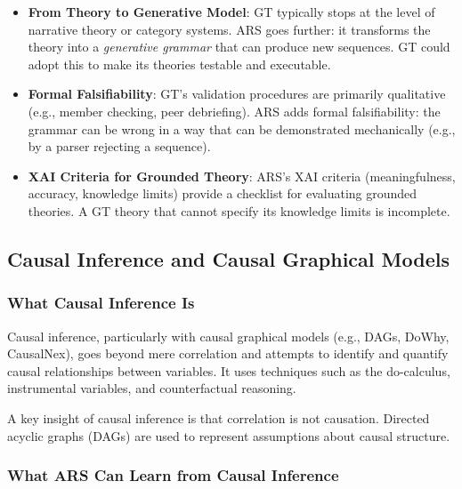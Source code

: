 \documentclass[12pt,a4paper]{article}
\begin{document}
\begin{itemize}
    \item \textbf{From Theory to Generative Model}: GT typically stops at the 
    level of narrative theory or category systems. ARS goes further: it 
    transforms the theory into a \textit{generative grammar} that can produce 
    new sequences. GT could adopt this to make its theories testable and 
    executable.
    
    \item \textbf{Formal Falsifiability}: GT's validation procedures are 
    primarily qualitative (e.g., member checking, peer debriefing). ARS adds 
    formal falsifiability: the grammar can be wrong in a way that can be 
    demonstrated mechanically (e.g., by a parser rejecting a sequence).
    
    \item \textbf{XAI Criteria for Grounded Theory}: ARS's XAI criteria 
    (meaningfulness, accuracy, knowledge limits) provide a checklist for 
    evaluating grounded theories. A GT theory that cannot specify its 
    knowledge limits is incomplete.
\end{itemize}

\subsection{Causal Inference and Causal Graphical Models}

\subsubsection{What Causal Inference Is}

Causal inference, particularly with causal graphical models (e.g., DAGs, 
DoWhy, CausalNex), goes beyond mere correlation and attempts to identify 
and quantify causal relationships between variables. It uses techniques 
such as the do-calculus, instrumental variables, and counterfactual reasoning.

A key insight of causal inference is that correlation is not causation. 
Directed acyclic graphs (DAGs) are used to represent assumptions about 
causal structure.

\subsubsection{What ARS Can Learn from Causal Inference}
\end{document}
